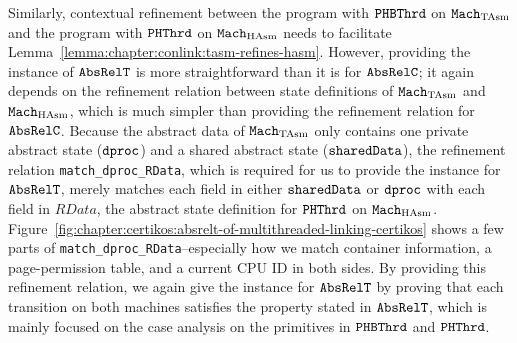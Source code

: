  Similarly, 
 contextual refinement between the program with ${{\mathrm{\texttt{PHBThrd}}}}$ on ${\mathrm{\texttt{Mach}}}_{\mathrm{TAsm}}$ and 
 the program with ${{\mathrm{\texttt{PHThrd}}}}$ on ${\mathrm{\texttt{Mach}}}_{\mathrm{HAsm}}$
 needs to facilitate Lemma~\ref{lemma:chapter:conlink:tasm-refines-hasm}.
However, providing the instance of ${{\mathrm{\texttt{AbsRelT}}}}$ is more straightforward than it is for  ${{\mathrm{\texttt{AbsRelC}}}}$;
it again depends on the refinement relation between  state definitions of ${\mathrm{\texttt{Mach}}}_{\mathrm{TAsm}}$ and ${\mathrm{\texttt{Mach}}}_{\mathrm{HAsm}}$,
which is much simpler than providing the refinement relation for  ${{\mathrm{\texttt{AbsRelC}}}}$.
Because the abstract data of ${\mathrm{\texttt{Mach}}}_{\mathrm{TAsm}}$ only contains one private abstract state (${\mathrm{\texttt{dproc}}}$) and 
a shared abstract state (${\mathrm{\texttt{sharedData}}}$), 
the refinement relation \lstinline$match_dproc_RData$, which is required for us to provide the instance for ${{\mathrm{\texttt{AbsRelT}}}}$,
merely matches each field in either ${\mathrm{\texttt{sharedData}}}$ or ${\mathrm{\texttt{dproc}}}$ with
each field in $RData$, the abstract state definition for ${{\mathrm{\texttt{PHThrd}}}}$ on ${\mathrm{\texttt{Mach}}}_{\mathrm{HAsm}}$.
Figure~\ref{fig:chapter:certikos:absrelt-of-multithreaded-linking-certikos} shows a few parts of \lstinline$match_dproc_RData$--especially how we match container information, a page-permission table, and a current CPU ID in both sides.
By providing this refinement relation,
we again give the instance for ${{\mathrm{\texttt{AbsRelT}}}}$ by proving 
that each transition on both machines satisfies the property stated in ${{\mathrm{\texttt{AbsRelT}}}}$,
which is mainly focused on the case analysis on the primitives in  ${{\mathrm{\texttt{PHBThrd}}}}$ and ${{\mathrm{\texttt{PHThrd}}}}$.


